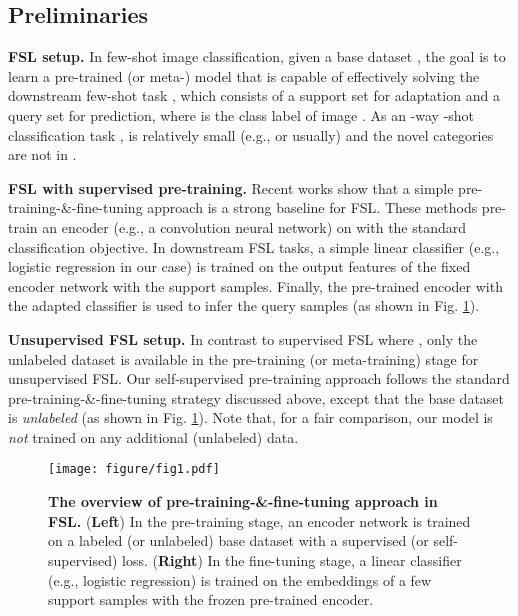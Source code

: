 \documentclass[runningheads]{llncs}
\begin{document}
\subsection{Preliminaries \label{sec:method_pre}}

\noindent\textbf{FSL setup.} 
In few-shot image classification, given a base dataset , the goal is to learn a pre-trained (or meta-) model that is capable of effectively solving the downstream few-shot task , which consists of a support set  for adaptation and a query set  for prediction, where  is the class label of image .  As an -way -shot classification task ,  is relatively small (e.g.,  or  usually) and the  novel categories are not in . 

\noindent\textbf{FSL with supervised pre-training.} 
Recent works \cite{tian2020rethinking,chen2019a} show that a simple pre-training-\&-fine-tuning approach is a strong baseline for FSL.
These methods pre-train an encoder (e.g., a convolution neural network) on  with the standard classification objective.
In downstream FSL tasks, a simple linear classifier (e.g., logistic regression in our case) is trained on the output features of the fixed encoder network with the support samples.
Finally, the pre-trained encoder with the adapted classifier is used to infer the query samples (as shown in Fig. \ref{fig:overview}). 

\noindent\textbf{Unsupervised FSL setup.} 
In contrast to supervised FSL where  , only the unlabeled dataset  is available in the pre-training (or meta-training) stage for unsupervised FSL.
Our self-supervised pre-training approach follows the standard pre-training-\&-fine-tuning strategy discussed above, except that the base dataset is \textit{unlabeled} (as shown in Fig. \ref{fig:overview}). Note that, for a fair comparison, our model is \textit{not} trained on any additional (unlabeled) data.

\begin{figure}[t]
    \centering  
    \texttt{[image: figure/fig1.pdf]}
    \caption{\textbf{The overview of pre-training-\&-fine-tuning approach in FSL.} (\textbf{Left}) In the pre-training stage, an encoder network is trained on a labeled (or unlabeled) base dataset with a supervised (or self-supervised) loss. (\textbf{Right}) In the fine-tuning stage, a linear classifier (e.g., logistic regression) is trained on the embeddings of a few support samples with the frozen pre-trained encoder.}
    \label{fig:overview}
\end{figure}
\end{document}
